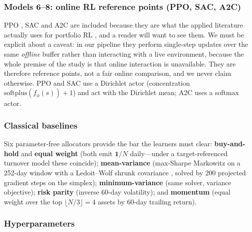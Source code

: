 \documentclass[11pt]{article}
\begin{document}
\subsubsection{Models 6--8: online RL reference points (PPO, SAC, A2C)}

PPO \cite{schulman2017proximal}, SAC \cite{haarnoja2018soft} and A2C
\cite{mnih2016asynchronous} are included because they are what the applied
literature actually uses for portfolio RL \cite{yang2020deep,liu2021finrl}, and a reader will
want to see them. We must be explicit about a caveat: in our pipeline they perform single-step
updates over the same \emph{offline} buffer rather than interacting with a live environment,
because the whole premise of the study is that online interaction is unavailable. They are
therefore reference points, not a fair online comparison, and we never claim otherwise. PPO
and SAC use a Dirichlet actor (concentration $\mathrm{softplus}(f_\phi(s)) + 1$) and act with
the Dirichlet mean; A2C uses a softmax actor.

\subsubsection{Classical baselines}

Six parameter-free allocators provide the bar the learners must clear:
\textbf{buy-and-hold} and \textbf{equal weight} (both emit $\mathbf{1}/N$ daily---under a
target-referenced turnover model these coincide);
\textbf{mean-variance} (max-Sharpe Markowitz \cite{markowitz1952portfolio} on a 252-day window
with a Ledoit--Wolf shrunk covariance \cite{ledoit2004wellconditioned}, solved by 200 projected
gradient steps on the simplex);
\textbf{minimum-variance} (same solver, variance objective);
\textbf{risk parity} (inverse 60-day volatility);
and \textbf{momentum} (equal weight over the top $\lfloor N/3 \rfloor = 4$ assets by 60-day
trailing return).

\subsubsection{Hyperparameters}
\end{document}
